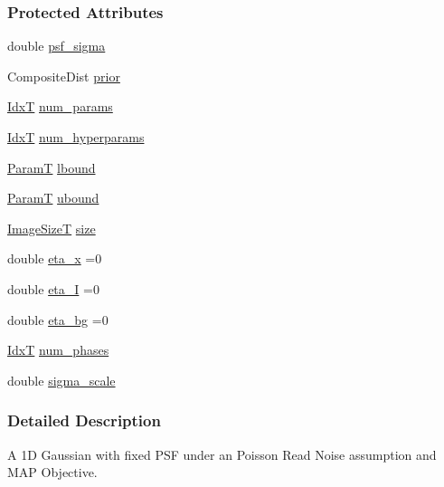 \subsubsection*{Protected Attributes}
\begin{DoxyCompactItemize}
\item 
double \hyperlink{classmappel_1_1Gauss1DModel_a62c6b2a5d8ab5f5596504a19daed66b2}{psf\+\_\+sigma}
\item 
Composite\+Dist \hyperlink{classmappel_1_1PointEmitterModel_a393839f8eb1dd3d61c9369377742ba0e}{prior}
\item 
\hyperlink{namespacemappel_ab17ec0f30b61ece292439d7ece81d3a8}{IdxT} \hyperlink{classmappel_1_1PointEmitterModel_a9af0484391bd6021ddc04ac666ab49ad}{num\+\_\+params}
\item 
\hyperlink{namespacemappel_ab17ec0f30b61ece292439d7ece81d3a8}{IdxT} \hyperlink{classmappel_1_1PointEmitterModel_ab2423214fdd81c8212118770b5b17b1f}{num\+\_\+hyperparams}
\item 
\hyperlink{classmappel_1_1PointEmitterModel_a665ec6aea3aac139bb69a23c06d4b9a1}{ParamT} \hyperlink{classmappel_1_1PointEmitterModel_a889bc82f74cfa654da121e5770296ab2}{lbound}
\item 
\hyperlink{classmappel_1_1PointEmitterModel_a665ec6aea3aac139bb69a23c06d4b9a1}{ParamT} \hyperlink{classmappel_1_1PointEmitterModel_a35b883e84b6a2e0093bdf482c623beef}{ubound}
\item 
\hyperlink{classmappel_1_1ImageFormat1DBase_a6456bab2b26702022ee32ae19e90dcac}{Image\+SizeT} \hyperlink{classmappel_1_1ImageFormat1DBase_a8941b4d028e4dd881146a7c1b9039bb1}{size}
\item 
double \hyperlink{classmappel_1_1MCMCAdaptor1D_ae5787e38c9cef6168acf6fc5d3216693}{eta\+\_\+x} =0
\item 
double \hyperlink{classmappel_1_1MCMCAdaptor1D_a5780d326be0c40e10d6c91777cfffbd3}{eta\+\_\+I} =0
\item 
double \hyperlink{classmappel_1_1MCMCAdaptor1D_af54c93421b8e298289cbb92743c6b3d5}{eta\+\_\+bg} =0
\item 
\hyperlink{namespacemappel_ab17ec0f30b61ece292439d7ece81d3a8}{IdxT} \hyperlink{classmappel_1_1MCMCAdaptorBase_a44b90a984ace712584074dc17831fe25}{num\+\_\+phases}
\item 
double \hyperlink{classmappel_1_1MCMCAdaptorBase_a76312f7d589bf3f3e754beca174b884b}{sigma\+\_\+scale}
\end{DoxyCompactItemize}


\subsubsection{Detailed Description}
A 1D Gaussian with fixed P\+SF under an Poisson Read Noise assumption and M\+AP Objective. 


